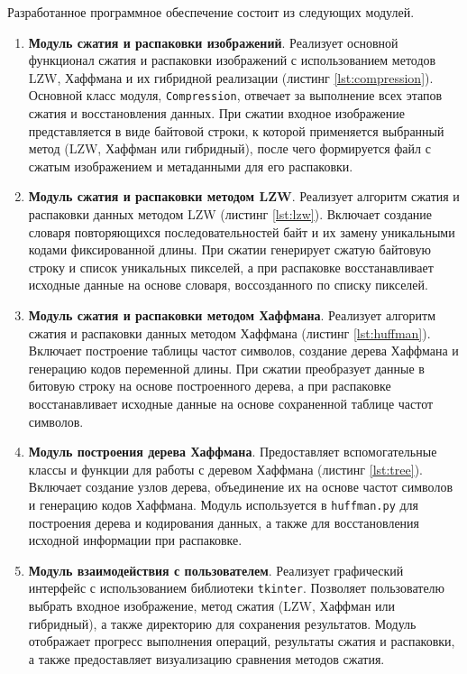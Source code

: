 Разработанное программное обеспечение состоит из следующих модулей.
\begin{enumerate}
    \item \textbf{Модуль сжатия и распаковки изображений}. Реализует основной функционал сжатия и распаковки изображений с использованием методов LZW, Хаффмана и их гибридной реализации (листинг \ref{lst:compression}). Основной класс модуля, \texttt{Compression}, отвечает за выполнение всех этапов сжатия и восстановления данных. При сжатии входное изображение представляется в виде байтовой строки, к которой применяется выбранный метод (LZW, Хаффман или гибридный), после чего формируется файл с сжатым изображением и метаданными для его распаковки.
    \item \textbf{Модуль сжатия и распаковки методом LZW}. Реализует алгоритм сжатия и распаковки данных методом LZW (листинг \ref{lst:lzw}). Включает создание словаря повторяющихся последовательностей байт и их замену уникальными кодами фиксированной длины. При сжатии генерирует сжатую байтовую строку и список уникальных пикселей, а при распаковке восстанавливает исходные данные на основе словаря, воссозданного по списку пикселей.
    \item \textbf{Модуль сжатия и распаковки методом Хаффмана}. Реализует алгоритм сжатия и распаковки данных методом Хаффмана (листинг \ref{lst:huffman}). Включает построение таблицы частот символов, создание дерева Хаффмана и генерацию кодов переменной длины. При сжатии преобразует данные в битовую строку на основе построенного дерева, а при распаковке восстанавливает исходные данные на основе сохраненной таблице частот символов.
    \item \textbf{Модуль построения дерева Хаффмана}. Предоставляет вспомогательные классы и функции для работы с деревом Хаффмана (листинг \ref{lst:tree}). Включает создание узлов дерева, объединение их на основе частот символов и генерацию кодов Хаффмана. Модуль используется в \texttt{huffman.py} для построения дерева и кодирования данных, а также для восстановления исходной информации при распаковке.
    \item \textbf{Модуль взаимодействия с пользователем}. Реализует графический интерфейс с использованием библиотеки \texttt{tkinter}. Позволяет пользователю выбрать входное изображение, метод сжатия (LZW, Хаффман или гибридный), а также директорию для сохранения результатов. Модуль отображает прогресс выполнения операций, результаты сжатия и распаковки, а также предоставляет визуализацию сравнения методов сжатия.
\end{enumerate}

